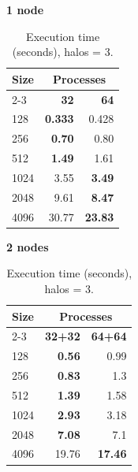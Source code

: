 \begin{table}[H]
\centering
\begin{minipage}[t]{0.48\textwidth}
\centering
\textbf{1 node}\\
\begin{tabular}{l|rr}
\hline
\textbf{Size} & \multicolumn{2}{c}{\textbf{Processes}} \\
\cline{2-3}
 & \textbf{32} & \textbf{64} \\
\hline
128 & \textbf{0.333} & 0.428 \\
256 & \textbf{0.70} & 0.80 \\
512 & \textbf{1.49} & 1.61 \\
1024 & 3.55 & \textbf{3.49} \\
2048 & 9.61 & \textbf{8.47} \\
4096 & 30.77 & \textbf{23.83} \\
\hline
\end{tabular}
\end{minipage}
\hfill
\begin{minipage}[t]{0.48\textwidth}
\centering
\textbf{2 nodes}\\
\begin{tabular}{l|rr}
\hline
\textbf{Size} & \multicolumn{2}{c}{\textbf{Processes}} \\
\cline{2-3}
 & \textbf{32+32} & \textbf{64+64} \\
\hline
128 & \textbf{0.56} & 0.99 \\
256 & \textbf{0.83} & 1.3 \\
512 & \textbf{1.39} & 1.58 \\
1024 & \textbf{2.93} & 3.18 \\
2048 & \textbf{7.08} & 7.1 \\
4096 & 19.76 & \textbf{17.46} \\
\hline
\end{tabular}
\end{minipage}
\caption{Execution time (seconds), halos = 3.}
\end{table}
